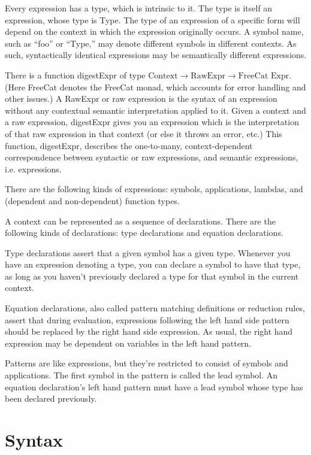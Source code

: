 \documentclass{article}
\begin{document}
Every expression has a type, which is intrinsic to it. The type is itself an expression, whose type is Type. The type of an expression of a specific form will depend on the context in which the expression originally occurs. A symbol name, such as ``foo'' or ``Type,'' may denote different symbols in different contexts. As such, syntactically identical expressions may be semantically different expressions.

There is a function digestExpr of type $\text{Context} \to \text{RawExpr} \to \text{FreeCat Expr}$. (Here FreeCat denotes the FreeCat monad, which accounts for error handling and other issues.) A RawExpr or raw expression is the syntax of an expression without any contextual semantic interpretation applied to it. Given a context and a raw expression, digestExpr gives you an expression which is the interpretation of that raw expression in that context (or else it throws an error, etc.) This function, digestExpr, describes the one-to-many, context-dependent correspondence between syntactic or raw expressions, and semantic expressions, i.e. expressions.

There are the following kinds of expressions: symbols, applications, lambdas, and (dependent and non-dependent) function types.

A context can be represented as a sequence of declarations. There are the following kinds of declarations: type declarations and equation declarations.

Type declarations assert that a given symbol has a given type. Whenever you have an expression denoting a type, you can declare a symbol to have that type, as long as you haven't previously declared a type for that symbol in the current context.

Equation declarations, also called pattern matching definitions or reduction rules, assert that during evaluation, expressions following the left hand side pattern should be replaced by the right hand side expression. As usual, the right hand expression may be dependent on variables in the left hand pattern.

Patterns are like expressions, but they're restricted to consist of symbols and applications. The first symbol in the pattern is called the lead symbol. An equation declaration's left hand pattern must have a lead symbol whose type has been declared previously.

\section{Syntax}
\end{document}
